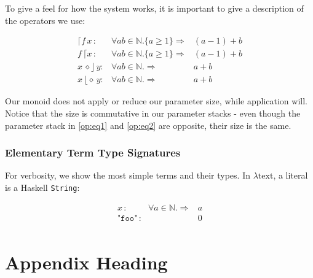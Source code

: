 \documentclass{article}
\begin{document}
\begin{flushleft}
To give a feel for how the system works, it is important to give a description
of the operators we use:
\end{flushleft}

\begin{align}
\lceil f \, x \, :
  & \forall a b \in \mathbb{N}. \{a \geq 1\} \Rightarrow & (a-1) + b \label{op:eq1}\\
f \, \lceil x \, :
  & \forall a b \in \mathbb{N}. \{a \geq 1\} \Rightarrow & (a-1) + b \label{op:eq2}\\
x \, \diamond \rfloor \, y :
  & \forall a b \in \mathbb{N}. \Rightarrow              & a + b\\
x \, \lfloor \diamond \, y :
  & \forall a b \in \mathbb{N}. \Rightarrow              & a + b
\end{align}

\begin{flushleft}
Our monoid does not apply or reduce our parameter size, while application will.
Notice that the size is commutative in our parameter stacks - even though
the parameter stack in \ref{op:eq1} and \ref{op:eq2} are opposite, their size
is the same.
\end{flushleft}

\subsubsection{Elementary Term Type Signatures}

For verbosity, we show the most simple terms and their types. In
$\lambda\mathrm{text}$, a literal is a Haskell \texttt{String}:

\begin{align}
x \, :
  & \forall a \in \mathbb{N}. \Rightarrow & a\\
\mathrm{\texttt{"foo"}} \, :            & & 0\\
\end{align}




\appendix

\section{Appendix Heading}
\end{document}
